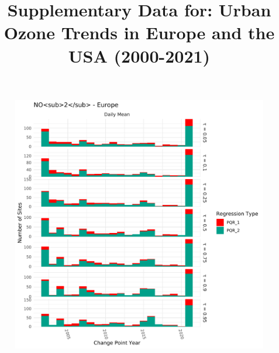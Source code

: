 \documentclass{article}
\title{Supplementary Data for: Urban Ozone Trends in Europe and the USA (2000-2021)}
\date{}
\begin{document}
\maketitle
\clearpage

\begin{figure}[p]
\centering
\includegraphics[width=\linewidth]{figures/si_figures/cp_year/cp_year_no2_Europe.pdf}
\caption{}
\label{si_fig:o3_map_eu_mda8_warm}
\end{figure}
\clearpage
\end{document}
